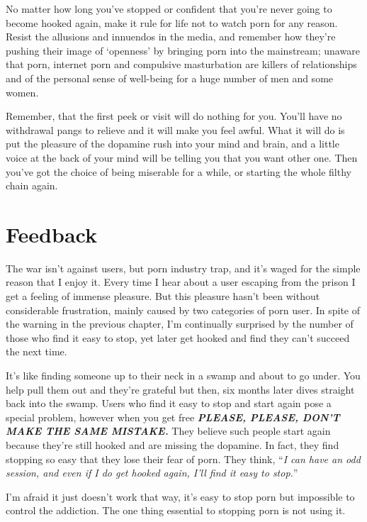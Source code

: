 \documentclass[
]{book}
\begin{document}
No matter how long you've stopped or confident that you're never going to become hooked again, make it rule for life not to watch porn for any reason. Resist the allusions and innuendos in the media, and remember how they're pushing their image of `openness' by bringing porn into the mainstream; unaware that porn, internet porn and compulsive masturbation are killers of relationships and of the personal sense of well-being for a huge number of men and some women.

Remember, that the first peek or visit will do nothing for you. You'll have no withdrawal pangs to relieve and it will make you feel awful. What it will do is put the pleasure of the dopamine rush into your mind and brain, and a little voice at the back of your mind will be telling you that you want other one. Then you've got the choice of being miserable for a while, or starting the whole filthy chain again.

\hypertarget{feedback}{%
\chapter{Feedback}\label{feedback}}

The war isn't against users, but porn industry trap, and it's waged for the simple reason that I enjoy it. Every time I hear about a user escaping from the prison I get a feeling of immense pleasure. But this pleasure hasn't been without considerable frustration, mainly caused by two categories of porn user. In spite of the warning in the previous chapter, I'm continually surprised by the number of those who find it easy to stop, yet later get hooked and find they can't succeed the next time.

It's like finding someone up to their neck in a swamp and about to go under. You help pull them out and they're grateful but then, six months later dives straight back into the swamp. Users who find it easy to stop and start again pose a special problem, however when you get free \textbf{\emph{PLEASE, PLEASE, DON'T MAKE THE SAME MISTAKE.}} They believe such people start again because they're still hooked and are missing the dopamine. In fact, they find stopping so easy that they lose their fear of porn. They think, ``\emph{I can have an odd session, and even if I do get hooked again, I'll find it easy to stop.}''

I'm afraid it just doesn't work that way, it's easy to stop porn but impossible to control the addiction. The one thing essential to stopping porn is not using it.
\end{document}
